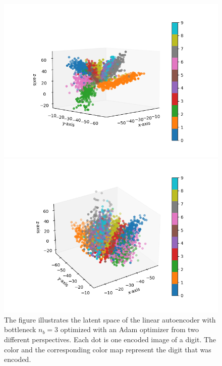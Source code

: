 \begin{figure}
\begin{center}
   \begin{minipage}[b]{0.49\linewidth}
      \includegraphics[trim = 20mm 10mm 20mm 10mm, clip, width=\linewidth]{linear_AE_3d_adam_latent_1}
	\end{minipage}
	\begin{minipage}[b]{0.49\linewidth}
      \includegraphics[trim = 20mm 10mm 20mm 10mm, clip, width=\linewidth]{linear_AE_3d_adam_latent_2}
	\end{minipage}
\end{center}
\caption{The figure illustrates the latent space of the linear autoencoder with bottleneck $n_b=3$ optimized with an Adam optimizer from two different perspectives. Each dot is one encoded image of a digit. The color and the corresponding color map represent the digit that was encoded.}\label{fig:linear_AE_3d_adam_latent}
\end{figure}

